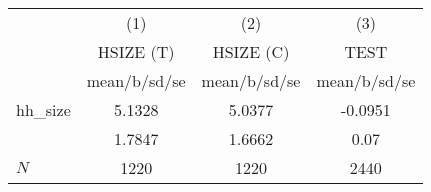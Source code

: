 {
\def\sym#1{\ifmmode^{#1}\else\(^{#1}\)\fi}
\begin{tabular}{l*{3}{c}}
\hline\hline
            &\multicolumn{1}{c}{(1)}&\multicolumn{1}{c}{(2)}&\multicolumn{1}{c}{(3)}\\
            &\multicolumn{1}{c}{HSIZE (T)}&\multicolumn{1}{c}{HSIZE (C)}&\multicolumn{1}{c}{TEST}\\
            &mean/b/sd/se&mean/b/sd/se&mean/b/sd/se\\
\hline
hh\_size     &     5.1328 &     5.0377 &     -0.0951\\
            &     1.7847 &     1.6662 &        0.07\\
\hline
\(N\)       &        1220&        1220&        2440\\
\hline\hline
\end{tabular}
}
